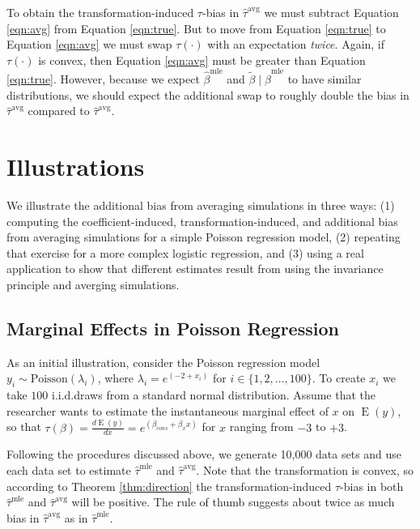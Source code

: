 \documentclass[11pt]{article}
\DeclareMathOperator*{\E}{\text{E}}
\begin{document}
To obtain the transformation-induced $\tau$-bias in $\hat{\tau}^\text{avg}$ we must subtract Equation \ref{eqn:avg} from Equation \ref{eqn:true}.
But to move from Equation \ref{eqn:true} to Equation \ref{eqn:avg} we must swap $\tau(\cdot)$ with an expectation \emph{twice}.
Again, if $\tau(\cdot)$ is convex, then Equation \ref{eqn:avg} must be greater than Equation \ref{eqn:true}.
However, because we expect $\hat{\beta}^\text{mle}$ and $\tilde{\beta} \mid \hat{\beta}^\text{mle}$ to have similar distributions, we should expect the additional swap to roughly double the bias in $\hat{\tau}^\text{avg}$ compared to $\hat{\tau}^\text{avg}$.

\section*{Illustrations}

We illustrate the additional bias from averaging simulations in three ways: (1) computing the coefficient-induced, transformation-induced, and additional bias from averaging simulations for a simple Poisson regression model, (2) repeating that exercise for a more complex logistic regression, and (3) using a real application to show that different estimates result from using the invariance principle and averging simulations.

\subsection*{Marginal Effects in Poisson Regression}

As an initial illustration, consider the Poisson regression model $y_i \sim \text{Poisson}(\lambda_i)$, where $\lambda_i = e^{(-2 + x_i)}$ for $i \in \{1, 2,\ldots, 100\}$.
To create $x_i$ we take $100$ i.i.d.\@ draws from a standard normal distribution.
Assume that the researcher wants to estimate the instantaneous marginal effect of $x$ on $\E(y)$, so that $\tau(\beta) = \frac{d \E (y)}{dx} = e^{(\beta_{cons} + \beta_x x)}$ for $x$ ranging from $-3$ to $+3$.

Following the procedures discussed above, we generate 10,000 data sets and use each data set to estimate $\hat{\tau}^\text{mle}$ and $\hat{\tau}^\text{avg}$.
Note that the transformation is convex, so according to Theorem \ref{thm:direction} the transformation-induced $\tau$-bias in both $\hat{\tau}^\text{mle}$ and $\hat{\tau}^\text{avg}$ will be positive.
The rule of thumb suggests about twice as much bias in $\hat{\tau}^\text{avg}$ as in $\hat{\tau}^\text{mle}$.
\end{document}
